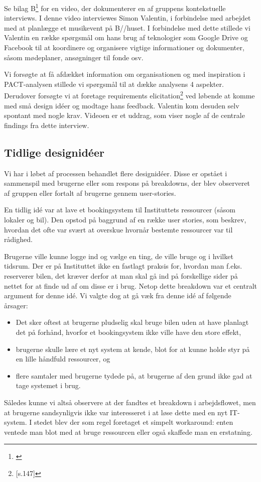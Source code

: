 Se bilag B\footnote{\citep{Medie}} for en video, der dokumenterer en af gruppens kontekstuelle interviews. I denne video interviewes Simon Valentin, i forbindelse med arbejdet med at planlægge et musikevent på B//huset. I forbindelse med dette stillede vi Valentin en række spørgsmål om hans brug af teknologier som Google Drive og Facebook til at koordinere og organisere vigtige informationer og dokumenter, såsom mødeplaner, ansøgninger til fonde osv.

Vi forsøgte at få afdækket information om organisationen og med inspiration i PACT-analysen stillede vi spørgsmål til at dække analysens 4 aspekter. Derudover forsøgte vi at foretage requirements elicitation\footnote{\citep{Benyon}[s.147]} ved løbende at komme med små design idéer og modtage hans feedback. Valentin kom desuden selv spontant med nogle krav. Videoen er et uddrag, som viser nogle af de centrale findings fra dette interview.

\subsection{Tidlige designidéer}
Vi har i løbet af processen behandlet flere designidéer. Disse er opstået i sammenspil med brugerne eller som respons på breakdowns, der blev observeret af gruppen eller fortalt af brugerne gennem user-stories.

En tidlig idé var at lave et bookingsystem til Instituttets ressourcer (såsom lokaler og bil). Den opstod på baggrund af en række user stories, som beskrev, hvordan det ofte var svært at overskue hvornår bestemte ressourcer var til rådighed.

Brugerne ville kunne logge ind og vælge en ting, de ville bruge og i hvilket tidsrum. Der er på Instituttet ikke en fastlagt praksis for, hvordan man f.eks. reserverer bilen, det kræver derfor at man skal gå ind på forskellige sider på nettet for at finde ud af om disse er i brug. Netop dette breakdown var et centralt argument for denne idé. 
Vi valgte dog at gå væk fra denne idé af følgende årsager: 
\begin{itemize}
	\item Det sker oftest at brugerne pludselig skal bruge bilen uden at have planlagt det på forhånd, hvorfor et bookingsystem ikke ville have den store effekt,
	\item brugerne skulle lære et nyt system at kende, blot for at kunne holde styr på en lille håndfuld ressourcer, og
	\item flere samtaler med brugerne tydede på, at brugerne af den grund ikke gad at tage systemet i brug.
\end{itemize}
Således kunne vi altså observere at der fandtes et breakdown i arbejdsflowet, men at brugerne sandsynligvis ikke var interesseret i at løse dette med en nyt IT-system. I stedet blev der som regel foretaget et simpelt workaround: enten ventede man blot med at bruge ressourcen eller også skaffede man en erstatning.

